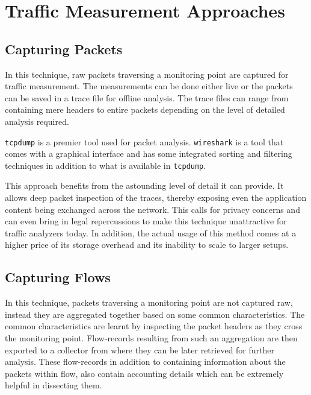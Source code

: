 \chapter{Traffic Measurement Approaches}\label{ch:traffic-measurement-approaches}

\section{Capturing Packets}\label{sec:capturing-packets}
In this technique, raw packets traversing a monitoring point are captured for traffic measurement. The measurements can be done either live or the packets can be saved in a trace file for offline analysis. The trace files can range from containing mere headers to entire packets depending on the level of detailed analysis required. 

\texttt{tcpdump} \cite{... } is a premier tool used for packet analysis. \texttt{wireshark} \cite{...} is a  tool that comes with a graphical interface and has some integrated sorting and filtering techniques in addition to what is available in \texttt{tcpdump}. 

This approach benefits from the astounding level of detail it can provide. It allows deep packet inspection of the traces, thereby exposing even the application content being exchanged  across the network. This calls for privacy concerns and can even bring in legal repercussions to make this technique unattractive for traffic analyzers today. In addition, the actual usage of this method comes at a higher price of its storage overhead and its inability to scale to larger setups.



\section{Capturing Flows}\label{sec:capturing-flows}
In this technique, packets traversing a monitoring point are not captured raw, instead they are aggregated together based on some common characteristics. The common characteristics are learnt by inspecting the packet headers as they cross the monitoring point. Flow-records resulting from such an aggregation are then exported to a collector from where they can be later retrieved for further analysis. These flow-records in addition to containing information about the packets within flow, also contain accounting details which can be extremely helpful in dissecting them. 

